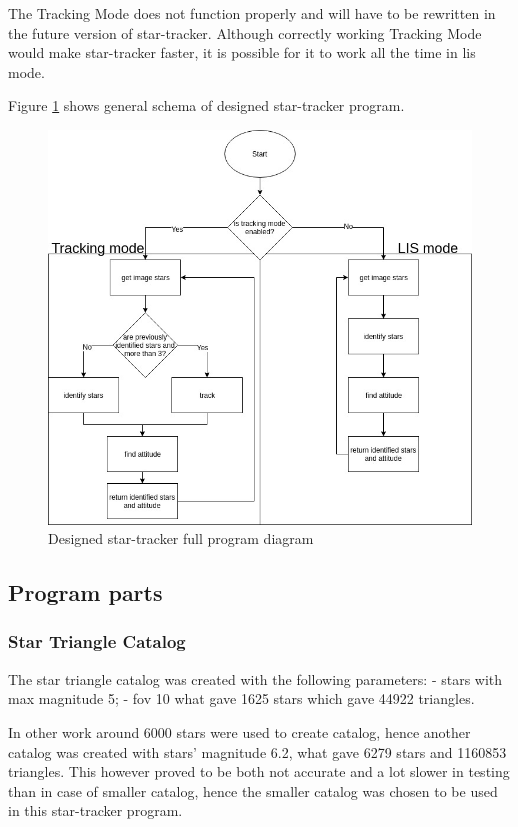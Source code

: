 \documentclass[12pt,a4paper,twoside]{article}
\begin{document}
The Tracking Mode does not function properly and will have to be rewritten in the future version of star-tracker. Although correctly working Tracking Mode would make star-tracker faster, it is possible for it to work all the time in \gls{lis} mode.

Figure \ref{fig:star-tracker_diagram} shows general schema of designed star-tracker program.

\begin{figure}[!htbp]
\includegraphics[scale=0.53]{startracker_full_diagram.jpg}
\centering
\caption{Designed star-tracker full program diagram}
\label{fig:star-tracker_diagram}
\end{figure}


\subsection{Program parts}

\subsubsection{Star Triangle Catalog}

The star triangle catalog was created with the following parameters:
- stars with max magnitude 5;
- \gls{fov} 10\degree
what gave 1625 stars which gave 44922 triangles.

In other work\cite{mortari2004pyramid} around 6000 stars were used to create catalog, hence another catalog was created with stars' magnitude 6.2, what gave 6279 stars and 1160853 triangles. This however proved to be both not accurate and a lot slower in testing than in case of smaller catalog, hence the smaller catalog was chosen to be used in this star-tracker program.
\end{document}
